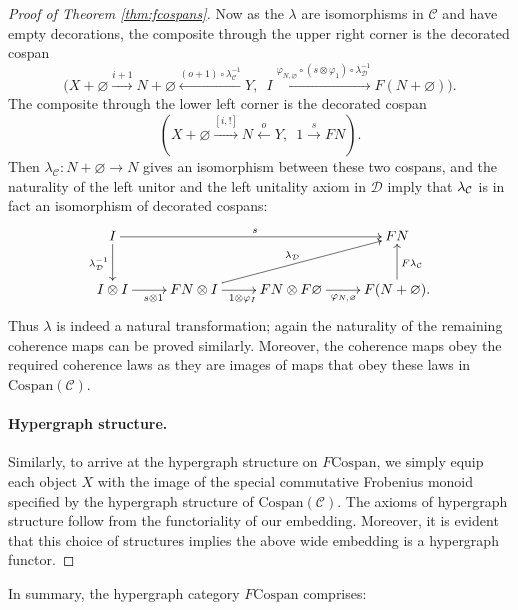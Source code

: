 \begin{proof}[Proof of Theorem \ref{thm:fcospans}]
Now as the $\lambda$ are isomorphisms in $\mathcal C$ and have empty
decorations, the composite through the upper right corner is the decorated
cospan
\[
  \big(X+\varnothing \xrightarrow{i+1} N+\varnothing
  \xleftarrow{(o+1)\circ \lambda^{-1}_{\mathcal C}} Y,\enspace I
  \xrightarrow{\varphi_{N,\varnothing} \circ (s \otimes \varphi_1) \circ
  \lambda^{-1}_{\mathcal D}} F(N+\varnothing)\big).
\]
The composite through the lower left corner is the decorated cospan
\[
  (X+\varnothing \stackrel{[i,!]}\longrightarrow N
\stackrel{o}\longleftarrow Y,\enspace 1 \stackrel{s}\longrightarrow FN).
\]
Then $\lambda_{\mathcal C}\colon  N+\varnothing \rightarrow N$ gives an isomorphism
between these two cospans, and the naturality of the left unitor and the left
unitality axiom in $\mathcal D$ imply that $\lambda_{\mathcal C}$ is in fact an
isomorphism of decorated cospans:
\[
  \xymatrix{
    I \ar[rrr]^{s} \ar[d]_{\lambda^{-1}_{\mathcal D}} &&& FN \\
    I \otimes I \ar[r]_{s \otimes 1} & FN \otimes I \ar[r]_{1 \otimes \varphi_I}
    \ar[urr]^{\lambda_{\mathcal D}} & FN \otimes F\varnothing
    \ar[r]_{\varphi_{N,\varnothing}} & F(N+\varnothing).
    \ar[u]_{F\lambda_{\mathcal C}}
  }
\]
Thus $\lambda$ is indeed a natural transformation; again the naturality of the
remaining coherence maps can be proved similarly. Moreover, the coherence maps
obey the required coherence laws as they are images of maps that obey these laws
in $\mathrm{Cospan(\mathcal{C})}$. 

\paragraph{Hypergraph structure.}
Similarly, to arrive at the hypergraph structure on \linebreak
$F\mathrm{Cospan}$, we simply equip each object $X$ with the image of the
special commutative Frobenius monoid specified by the hypergraph structure of
$\mathrm{Cospan(\mathcal{C})}$. The axioms of hypergraph structure follow from
the functoriality of our embedding. Moreover, it is evident that this choice of
structures implies the above wide embedding is a hypergraph functor.
\end{proof}

In summary, the hypergraph category $F\mathrm{Cospan}$ comprises:
\smallskip

